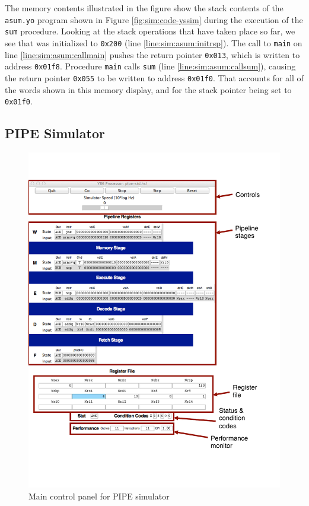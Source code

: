 \documentclass[11pt]{article}
\begin{document}
The memory contents illustrated in the figure show the stack contents
of the \texttt{asum.yo} program shown in Figure \ref{fig:sim:code-yssim} during the
execution of the \texttt{sum} procedure.  Looking at the stack
operations that have taken place so far, we see that \rspreg{} was
initialized to \texttt{0x200} (line \ref{line:sim:asum:initrsp}).  The call to
\texttt{main} on line \ref{line:sim:asum:callmain} pushes the return pointer \texttt{0x013},
which is written to address \texttt{0x01f8}.  Procedure \texttt{main}
calls \texttt{sum} (line \ref{line:sim:asum:callsum}), causing
the return pointer \texttt{0x055} to be written to
address \texttt{0x01f0}.
That accounts for all of the words shown
in this memory display, and for the stack pointer being set to \texttt{0x01f0}.

\subsection{PIPE Simulator}
\begin{figure}
\centerline{\includegraphics*[scale=1.0]{pipe-cntl}}
\caption{Main control panel for PIPE simulator}
\label{fig:sim:pipe-cntl}
\end{figure}
\end{document}

